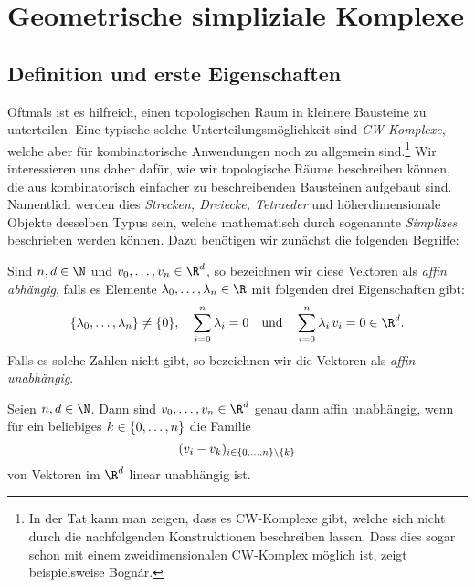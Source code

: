 \chapter{Geometrische simpliziale Komplexe}
\section{Definition und erste Eigenschaften} %
Oftmals ist es hilfreich, einen topologischen Raum in kleinere Bausteine zu
unterteilen. Eine typische solche Unterteilungsmöglichkeit sind \emph{CW-Komplexe}, welche
aber für kombinatorische Anwendungen noch zu allgemein sind.\footnote{%
    In der Tat kann man zeigen, dass es CW-Komplexe gibt, welche sich nicht
    durch die nachfolgenden Konstruktionen beschreiben lassen. Dass dies sogar
    schon mit einem zweidimensionalen CW-Komplex möglich ist, zeigt
    beispielsweise Bognár\cite{artcle:bognar77}.%
}
Wir interessieren uns daher dafür, wie wir topologische Räume beschreiben
können, die aus kombinatorisch einfacher zu beschreibenden Bausteinen aufgebaut
sind. Namentlich werden dies \emph{Strecken, Dreiecke, Tetraeder} und
höherdimensionale Objekte desselben Typus sein, welche mathematisch durch
sogenannte \emph{Simplizes} beschrieben werden können. Dazu benötigen wir
zunächst die folgenden Begriffe:

\begin{thDef}
    Sind $n,d\in\N$ und $v_0,\ldots,v_n\in\R^d$, so bezeichnen wir diese
    Vektoren als \emph{affin abhängig}, falls es Elemente
    $\lambda_0,\ldots,\lambda_n \in\R$ mit folgenden drei Eigenschaften gibt:
    \[ \{\lambda_0,\ldots,\lambda_n\} \neq \{0\}, \quad \isum^n \lambda_i = 0
    \qundq \isum^n \lambda_i\,v_i = 0 \in\R^d.\] 
    Falls es solche Zahlen nicht gibt, so bezeichnen wir die Vektoren als
    \emph{affin unabhängig}.
\end{thDef}

\begin{thLemma}
    \label{gsc:iffaffinlyindependet}
    Seien $n,d\in\N$. Dann sind $v_0,\ldots,v_n\in\R^d$ genau dann affin
    unabhängig, wenn für ein beliebiges $k\in\{0,\ldots,n\}$ die Familie
    \[  (v_i - v_k)_{i \in\{0,\ldots,n\}\setminus\{k\}} \] 
    von Vektoren im $\R^d$ linear unabhängig ist.
\end{thLemma}

